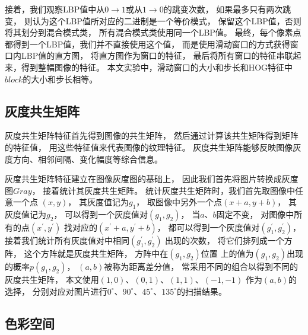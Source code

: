 接着，我们观察LBP值中从$0\rightarrow 1$或从$1\rightarrow 0$的跳变次数，
如果最多只有两次跳变，
则认为这个LBP值所对应的二进制是一个等价模式，
保留这个LBP值，否则将其划分到混合模式类，
所有混合模式类使用同一个LBP值。
最终，每个像素点都得到一个LBP值，我们并不直接使用这个值，
而是使用滑动窗口的方式获得窗口内LBP值的直方图，
将直方图作为窗口的特征，
最后将所有窗口的特征串联起来，得到整幅图像的特征。
本文实验中，滑动窗口的大小和步长和HOG特征中$block$的大小和步长相等。

\subsection{灰度共生矩阵}

灰度共生矩阵特征首先得到图像的共生矩阵，
然后通过计算该共生矩阵得到矩阵的特征值，
用这些特征值来代表图像的纹理特征。
灰度共生矩阵能够反映图像灰度方向、相邻间隔、变化幅度等综合信息。

灰度共生矩阵特征建立在图像灰度图的基础上，
因此我们首先将图片转换成灰度图$Gray$，
接着统计其灰度共生矩阵。
统计灰度共生矩阵时，我们首先取图像中任意一个点
$(x,y)$，
其灰度值记为${g}_{1}$，
取图像中另外一个点$(x+a,y+b)$，
其灰度值记为${g}_{2}$，
可以得到一个灰度值对$({g}_{1},{g}_{2})$，
当$a$、$b$固定不变，
对图像中所有的点$({x}^{'},{y}^{'})$
找对应的$({x}^{'}+a,{y}^{'}+b)$，
都可以得到一个灰度值对$({g}_{1}^{'},{g}_{2}^{'})$，
接着我们统计所有灰度值对中相同$({g}_{1}^{'},{g}_{2}^{'})$
出现的次数，
将它们排列成一个方阵，
这个方阵就是灰度共生矩阵，
方阵中在$({g}_{1},{g}_{2})$位置
上的值为$({g}_{1},{g}_{2})$出现的概率$p({g}_{1},{g}_{2})$，
$(a,b)$被称为距离差分值，
常采用不同的组合以得到不同的灰度共生矩阵，
本文使用$(1,0)$、$(0,1)$、$(1,1)$、$(-1,-1)$
作为$(a,b)$的选择，
分别对应对图片进行${0}^{\circ}$、${90}^{\circ}$、${45}^{\circ}$、${135}^{\circ}$的扫描结果。

\subsection{色彩空间}

